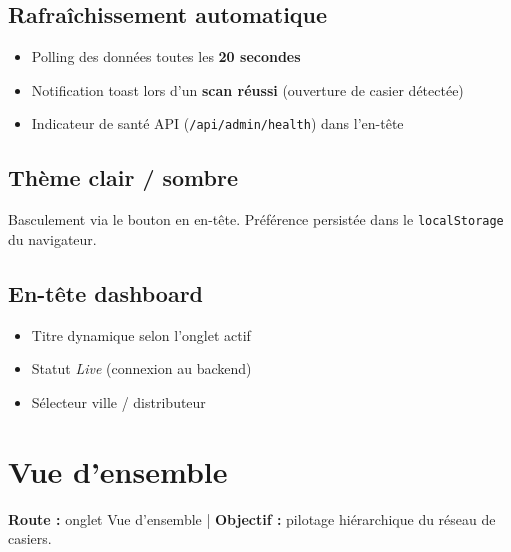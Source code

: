\documentclass[11pt,a4paper]{article}
\begin{document}
\subsection{Rafraîchissement automatique}
\begin{itemize}[noitemsep]
  \item Polling des données toutes les \textbf{20 secondes}
  \item Notification toast lors d'un \textbf{scan réussi} (ouverture de casier détectée)
  \item Indicateur de santé API (\texttt{/api/admin/health}) dans l'en-tête
\end{itemize}

\subsection{Thème clair / sombre}
Basculement via le bouton en en-tête. Préférence persistée dans le \texttt{localStorage} du navigateur.

\subsection{En-tête dashboard}
\begin{itemize}[noitemsep]
  \item Titre dynamique selon l'onglet actif
  \item Statut \textit{Live} (connexion au backend)
  \item Sélecteur ville / distributeur
\end{itemize}

\section{Vue d'ensemble}

\textbf{Route :} onglet \og Vue d'ensemble \fg{} | \textbf{Objectif :} pilotage hiérarchique du réseau de casiers.
\end{document}
